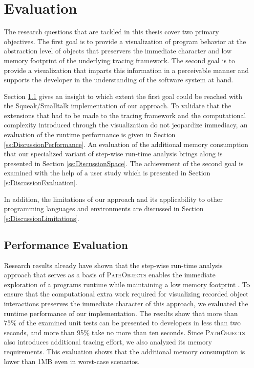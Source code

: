 \chapter{Evaluation}
\label{c:discussion}
The research questions that are tackled in this thesis cover two primary objectives.
The first goal is to provide a visualization of program behavior at the abstraction level of objects that preservers the immediate character and low memory footprint of the underlying tracing framework.
The second goal is to provide a visualization that imparts this information in a perceivable manner and supports the developer in the understanding of the software system at hand.

Section \ref{s:DiscussionPerformance} gives an insight to which extent the first goal could be reached with the Squeak/Smalltalk implementation of our approach.
To validate that the extensions that had to be made to the tracing framework and the computational complexity introduced through the visualization do not jeopardize immediacy, an evaluation of the runtime performance is given in Section \ref{ss:DiscussionPerformance}.
An evaluation of the additional memory consumption that our specialized variant of  step-wise run-time analysis brings along is presented in Section \ref{ss:DiscussionSpace}. 
The achievement of the second goal is examined with the help of a user study which is presented in Section \ref{s:DiscussionEvaluation}.

In addition, the limitations of our approach and its applicability to other programming languages and environments are discussed in Section \ref{s:DiscussionLimitations}.

\section{Performance Evaluation}
\label{s:DiscussionPerformance}
Research results already have shown that the step-wise run-time analysis approach that serves as a basis of \textsc{PathObjects} enables the immediate exploration of a programs runtime while maintaining a low memory footprint \cite{perscheid_immediacy_2010}.
To ensure that the computational extra work required for visualizing recorded object interactions preserves the immediate character of this approach, we evaluated the runtime performance of our implementation.
The results show that more than 75\% of the examined unit tests can be presented to developers in less than two seconds, and more than 95\% take no more than ten seconds.
Since \textsc{PathObjects} also introduces additional tracing effort, we also analyzed its memory requirements.
This evaluation shows that the additional memory consumption is lower than 1MB even in worst-case scenarios.

